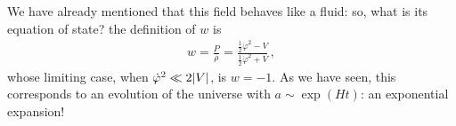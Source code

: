 \documentclass[main.tex]{subfiles}
\begin{document}
We have already mentioned that this field behaves like a fluid: so, what is its equation of state? the definition of \(w\) is 
%
\begin{align}
w
= \frac{P}{\rho }
= \frac{\frac{1}{2} \dot{\varphi }^2 - V}{\frac{1}{2} \dot{\varphi }^2 + V}
\,,
\end{align}
%
whose limiting case, when \(\dot{\varphi}^2 \ll 2 \abs{V}\), is \(w = -1\).
As we have seen, this corresponds to an evolution of the universe with \(a \sim \exp(Ht)\): an exponential expansion! 







\end{document}
